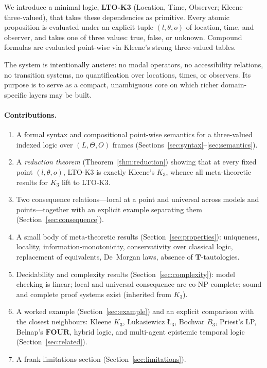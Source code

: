\documentclass[11pt,a4paper]{article}
\theoremstyle{definition}
\theoremstyle{plain}
\theoremstyle{remark}
\newcommand{\Tv}{\mathbf{T}}
\newcommand{\frm}{(l, \theta, o)}
\begin{document}
We introduce a minimal logic, \textbf{LTO-K3} (Location, Time, Observer;
Kleene three-valued), that takes these dependencies as primitive. Every
atomic proposition is evaluated under an explicit tuple
$\frm$ of location, time, and observer, and takes one of three values:
true, false, or unknown. Compound formulas are evaluated point-wise via
Kleene's strong three-valued tables.

The system is intentionally austere: no modal operators, no accessibility
relations, no transition systems, no quantification over locations, times,
or observers. Its purpose is to serve as a compact, unambiguous core on
which richer domain-specific layers may be built.

\paragraph{Contributions.}
\begin{enumerate}
  \item A formal syntax and compositional point-wise semantics for a
  three-valued indexed logic over $(L, \Theta, O)$ frames
  (Sections~\ref{sec:syntax}--\ref{sec:semantics}).
  \item A \emph{reduction theorem} (Theorem~\ref{thm:reduction}) showing
  that at every fixed point $\frm$, LTO-K3 is exactly Kleene's $K_3$,
  whence all meta-theoretic results for $K_3$ lift to LTO-K3.
  \item Two consequence relations---local at a point and universal across
  models and points---together with an explicit example separating them
  (Section~\ref{sec:consequence}).
  \item A small body of meta-theoretic results
  (Section~\ref{sec:properties}): uniqueness, locality,
  information-monotonicity, conservativity over classical logic,
  replacement of equivalents, De~Morgan laws, absence of $\Tv$-tautologies.
  \item Decidability and complexity results
  (Section~\ref{sec:complexity}): model checking is linear; local and
  universal consequence are co-NP-complete; sound and complete proof
  systems exist (inherited from $K_3$).
  \item A worked example (Section~\ref{sec:example}) and an explicit
  comparison with the closest neighbours: Kleene $K_3$,
  {\L}ukasiewicz $\text{\L}_3$, Bochvar $B_3$, Priest's LP, Belnap's
  $\mathbf{FOUR}$, hybrid logic, and multi-agent epistemic temporal logic
  (Section~\ref{sec:related}).
  \item A frank limitations section (Section~\ref{sec:limitations}).
\end{enumerate}
\end{document}
